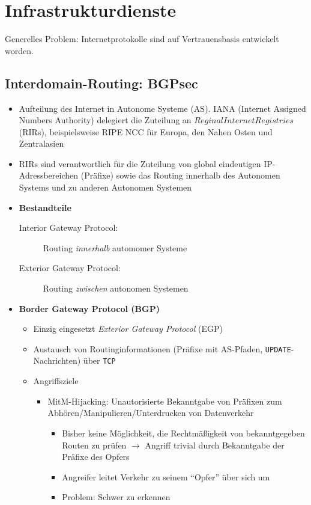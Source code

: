 \section{Infrastrukturdienste}
Generelles Problem: Internetprotokolle sind auf Vertrauensbasis entwickelt worden.

\subsection{Interdomain-Routing: BGPsec}
\begin{itemize}
	\item Aufteilung des Internet in Autonome Systeme (AS). IANA (Internet Assigned Numbers Authority) delegiert die Zuteilung an \(Reginal Internet Registries\) (RIRs), beispielsweise RIPE NCC für Europa, den Nahen Osten und Zentralasien
	\item RIRs sind verantwortlich für die Zuteilung von global eindeutigen IP-Adressbereichen (Präfixe) sowie das Routing innerhalb des Autonomen Systems und zu anderen Autonomen Systemen
	\item \textbf{Bestandteile}
	\begin{description}
		\item[Interior Gateway Protocol:] Routing \textit{innerhalb} automomer Systeme
		\item[Exterior Gateway Protocol:] Routing \textit{zwischen} autonomen Systemen
	\end{description}
	\item \textbf{Border Gateway Protocol (BGP)}
	\begin{itemize}
		\item Einzig eingesetzt \textit{Exterior Gateway Protocol} (EGP)
		\item Austausch von Routinginformationen (Präfixe mit AS-Pfaden, \texttt{UPDATE}-Nachrichten) über \texttt{TCP}
		\item Angriffsziele
		\begin{itemize}
			\item MitM-Hijacking: Unautorisierte Bekanntgabe von Präfixen zum Abhören/Manipulieren/Unterdrucken von Datenverkehr
			\begin{itemize}
				\item Bisher keine Möglichkeit, die Rechtmäßigkeit von bekanntgegeben Routen zu prüfen \(\rightarrow\) Angriff trivial durch Bekanntgabe der Präfixe des Opfers
				\item Angreifer leitet Verkehr zu seinem "`Opfer"' über sich um
				\item Problem: Schwer zu erkennen

\end{itemize}
\end{itemize}
\end{itemize}
\end{itemize}
